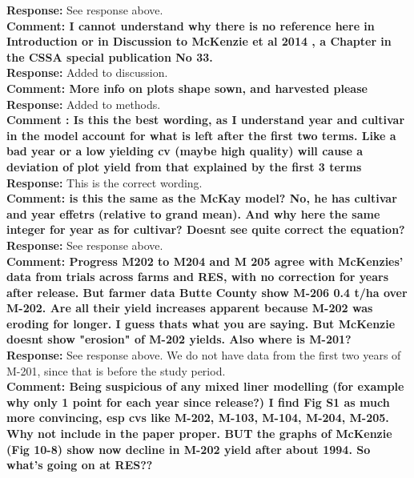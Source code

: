 \documentclass{article} \usepackage[margin=1in]{geometry}
\begin{document}
\textbf{Response: } See response above.\\

\textbf{Comment: I cannot understand why there is no reference here in
  Introduction or in Discussion to McKenzie et al 2014 , a Chapter in
  the CSSA special publication No 33.}\\

\textbf{Response: } Added to discussion.\\

\textbf{Comment: More info on plots shape sown, and harvested
  please}\\

\textbf{Response: } Added to methods.\\

\textbf{Comment : Is this the best wording, as I understand year and
  cultivar in the model account for what is left after the first two
  terms. Like a bad year or a low yielding cv (maybe high quality)
  will cause a deviation of plot yield from that explained by the
  first 3 terms}\\

\textbf{Response: } This is the correct wording.\\

\textbf{Comment: is this the same as the McKay model? No, he has
  cultivar and year effetrs (relative to grand mean). And why here the
  same integer for year as for cultivar? Doesnt see quite correct the
  equation?}\\

\textbf{Response: } See response above.\\

\textbf{Comment: Progress M202 to M204 and M 205 agree with McKenzies'
  data from trials across farms and RES, with no correction for years
  after release.  But farmer data Butte County show M-206 0.4 t/ha
  over M-202. Are all their yield increases apparent because M-202 was
  eroding for longer. I guess thats what you are saying. But McKenzie
  doesnt show "erosion" of M-202 yields. Also where is M-201?}\\

\textbf{Response: } See response above. We do not have data from the
first two years of M-201, since that is before the study period.\\

\textbf{Comment: Being suspicious of any mixed liner modelling (for
  example why only 1 point for each year since release?) I find Fig S1
  as much more convincing, esp cvs like M-202, M-103, M-104, M-204,
  M-205. Why not include in the paper proper.  BUT the graphs of
  McKenzie (Fig 10-8) show now decline in M-202 yield after about
  1994. So what's going on at RES??}\\
\end{document}
